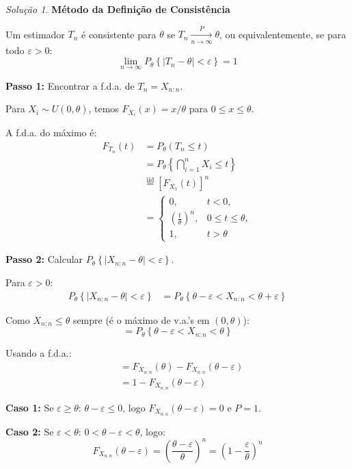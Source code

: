 \documentclass[12pt,a4paper]{article}
\theoremstyle{definition}
\theoremstyle{remark}
\newtheorem{solucao}{Solução}[section]
\begin{document}
\begin{solucao}
\textbf{Método da Definição de Consistência}

Um estimador $T_n$ é consistente para $\theta$ se $T_n \xrightarrow[n \to \infty]{P} \theta$, ou equivalentemente, se para todo $\varepsilon > 0$:
\[
\lim_{n \to \infty} P_\theta \left\{ |T_n - \theta| < \varepsilon \right\} = 1
\]

\textbf{Passo 1:} Encontrar a f.d.a. de $T_n = X_{n:n}$.

Para $X_i \sim U(0, \theta)$, temos $F_{X_i}(x) = x/\theta$ para $0 \leq x \leq \theta$.

A f.d.a. do máximo é:
\begin{align}
F_{T_n}(t) &= P_\theta(T_n \leq t) \\
&= P_\theta \left\{ \bigcap_{i=1}^n X_i \leq t \right\} \\
&\overset{\text{iid}}{=} \left[ F_{X_1}(t) \right]^n \\
&= 
\begin{cases}
0, & t < 0, \\
\left( \frac{t}{\theta} \right)^n, & 0 \leq t \leq \theta, \\
1, & t > \theta
\end{cases}
\end{align}

\textbf{Passo 2:} Calcular $P_\theta \left\{ |X_{n:n} - \theta| < \varepsilon \right\}$.

Para $\varepsilon > 0$:
\begin{align}
P_\theta \left\{ |X_{n:n} - \theta| < \varepsilon \right\} &= P_\theta \left\{ \theta - \varepsilon < X_{n:n} < \theta + \varepsilon \right\}
\end{align}

Como $X_{n:n} \leq \theta$ sempre (é o máximo de v.a.'s em $(0,\theta)$):
\[
= P_\theta \left\{ \theta - \varepsilon < X_{n:n} < \theta \right\}
\]

Usando a f.d.a.:
\begin{align}
&= F_{X_{n:n}}(\theta) - F_{X_{n:n}}(\theta - \varepsilon) \\
&= 1 - F_{X_{n:n}}(\theta - \varepsilon)
\end{align}

\textbf{Caso 1:} Se $\varepsilon \geq \theta$: $\theta - \varepsilon \leq 0$, logo $F_{X_{n:n}}(\theta - \varepsilon) = 0$ e $P = 1$.

\textbf{Caso 2:} Se $\varepsilon < \theta$: $0 < \theta - \varepsilon < \theta$, logo:
\[
F_{X_{n:n}}(\theta - \varepsilon) = \left( \frac{\theta - \varepsilon}{\theta} \right)^n = \left(1 - \frac{\varepsilon}{\theta}\right)^n
\]


\end{solucao}
\end{document}
